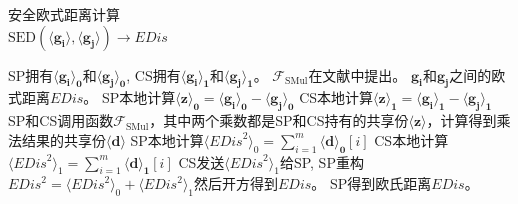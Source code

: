 \begin{algorithm}[htbp]
    \caption{安全欧式距离计算\\$\text{SED}(\boldsymbol{\langle g_i\rangle}, \boldsymbol{\langle g_j\rangle}) \xrightarrow{} \textit{EDis}$}
    \label{alg1}
    \begin{algorithmic}[1]
    \REQUIRE SP拥有$\boldsymbol{\langle g_i\rangle_0}$和$\boldsymbol{\langle g_j\rangle_0}$, CS拥有$\boldsymbol{\langle g_i\rangle_1}$和$\boldsymbol{\langle g_j\rangle_1}$。 $\mathcal{F}_{\text {SMul}}$在文献\cite{rathee2021sirnn}中提出。
    \ENSURE $\boldsymbol{g_i}$和$\boldsymbol{g_j}$之间的欧式距离$\textit{EDis}$。
    \STATE SP本地计算$\boldsymbol{\langle z\rangle_0} = \boldsymbol{\langle g_i\rangle_0} - \boldsymbol{\langle g_j\rangle_0}$
    \STATE CS本地计算$\boldsymbol{\langle z\rangle_1} = \boldsymbol{\langle g_i\rangle_1} - \boldsymbol{\langle g_j\rangle_1}$
    \STATE SP和CS调用函数$\mathcal{F}_{\text {SMul}}$，其中两个乘数都是SP和CS持有的共享份$\boldsymbol{\langle z\rangle}$，计算得到乘法结果的共享份$\boldsymbol{\langle d\rangle}$ 
    \STATE SP本地计算$\langle \textit{EDis}^2\rangle_0 = \sum_{i=1}^{m} \boldsymbol{\langle d\rangle_0}[i]$
    \STATE CS本地计算$\langle \textit{EDis}^2\rangle_1 = \sum_{i=1}^{m} \boldsymbol{\langle d\rangle_1}[i]$
    \STATE CS发送$\langle \textit{EDis}^2\rangle_1$给SP, SP重构$\textit{EDis}^2 = \langle \textit{EDis}^2\rangle_0 + \langle \textit{EDis}^2\rangle_1$然后开方得到$\textit{EDis}$。
    \RETURN SP得到欧氏距离$\textit{EDis}$。
    \end{algorithmic}
\end{algorithm}

